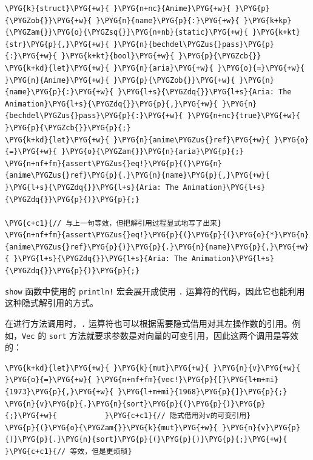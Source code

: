 \begin{Verbatim}[commandchars=\\\{\},breaklines=true,breakanywhere=true,fontsize=\codefont,xleftmargin=17bp]
\PYG{k}{struct}\PYG{+w}{ }\PYG{n+nc}{Anime}\PYG{+w}{ }\PYG{p}{\PYGZob{}}\PYG{+w}{ }\PYG{n}{name}\PYG{p}{:}\PYG{+w}{ }\PYG{k+kp}{\PYGZam{}}\PYG{o}{\PYGZsq{}}\PYG{n+nb}{static}\PYG{+w}{ }\PYG{k+kt}{str}\PYG{p}{,}\PYG{+w}{ }\PYG{n}{bechdel\PYGZus{}pass}\PYG{p}{:}\PYG{+w}{ }\PYG{k+kt}{bool}\PYG{+w}{ }\PYG{p}{\PYGZcb{}}
\PYG{k+kd}{let}\PYG{+w}{ }\PYG{n}{aria}\PYG{+w}{ }\PYG{o}{=}\PYG{+w}{ }\PYG{n}{Anime}\PYG{+w}{ }\PYG{p}{\PYGZob{}}\PYG{+w}{ }\PYG{n}{name}\PYG{p}{:}\PYG{+w}{ }\PYG{l+s}{\PYGZdq{}}\PYG{l+s}{Aria: The Animation}\PYG{l+s}{\PYGZdq{}}\PYG{p}{,}\PYG{+w}{ }\PYG{n}{bechdel\PYGZus{}pass}\PYG{p}{:}\PYG{+w}{ }\PYG{n+nc}{true}\PYG{+w}{ }\PYG{p}{\PYGZcb{}}\PYG{p}{;}
\PYG{k+kd}{let}\PYG{+w}{ }\PYG{n}{anime\PYGZus{}ref}\PYG{+w}{ }\PYG{o}{=}\PYG{+w}{ }\PYG{o}{\PYGZam{}}\PYG{n}{aria}\PYG{p}{;}
\PYG{n+nf+fm}{assert\PYGZus{}eq!}\PYG{p}{(}\PYG{n}{anime\PYGZus{}ref}\PYG{p}{.}\PYG{n}{name}\PYG{p}{,}\PYG{+w}{ }\PYG{l+s}{\PYGZdq{}}\PYG{l+s}{Aria: The Animation}\PYG{l+s}{\PYGZdq{}}\PYG{p}{)}\PYG{p}{;}

\PYG{c+c1}{// 与上一句等效，但把解引用过程显式地写了出来}
\PYG{n+nf+fm}{assert\PYGZus{}eq!}\PYG{p}{(}\PYG{p}{(}\PYG{o}{*}\PYG{n}{anime\PYGZus{}ref}\PYG{p}{)}\PYG{p}{.}\PYG{n}{name}\PYG{p}{,}\PYG{+w}{ }\PYG{l+s}{\PYGZdq{}}\PYG{l+s}{Aria: The Animation}\PYG{l+s}{\PYGZdq{}}\PYG{p}{)}\PYG{p}{;}
\end{Verbatim}

\texttt{show} 函数中使用的 \texttt{println!} 宏会展开成使用 \texttt{.} 运算符的代码，因此它也能利用这种隐式解引用的方式。

在进行方法调用时，\texttt{.} 运算符也可以根据需要隐式借用对其左操作数的引用。例如，\texttt{Vec} 的 \texttt{sort} 方法就要求参数是对向量的可变引用，因此这两个调用是等效的：

\begin{Verbatim}[commandchars=\\\{\},breaklines=true,breakanywhere=true,fontsize=\codefont,xleftmargin=17bp]
\PYG{k+kd}{let}\PYG{+w}{ }\PYG{k}{mut}\PYG{+w}{ }\PYG{n}{v}\PYG{+w}{ }\PYG{o}{=}\PYG{+w}{ }\PYG{n+nf+fm}{vec!}\PYG{p}{[}\PYG{l+m+mi}{1973}\PYG{p}{,}\PYG{+w}{ }\PYG{l+m+mi}{1968}\PYG{p}{]}\PYG{p}{;}
\PYG{n}{v}\PYG{p}{.}\PYG{n}{sort}\PYG{p}{(}\PYG{p}{)}\PYG{p}{;}\PYG{+w}{           }\PYG{c+c1}{// 隐式借用对v的可变引用}
\PYG{p}{(}\PYG{o}{\PYGZam{}}\PYG{k}{mut}\PYG{+w}{ }\PYG{n}{v}\PYG{p}{)}\PYG{p}{.}\PYG{n}{sort}\PYG{p}{(}\PYG{p}{)}\PYG{p}{;}\PYG{+w}{    }\PYG{c+c1}{// 等效，但是更烦琐}
\end{Verbatim}


